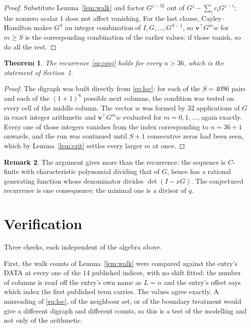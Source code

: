 \documentclass[11pt,a4paper]{article}
\theoremstyle{plain}
\newtheorem{theorem}{Theorem}
\theoremstyle{definition}
\newtheorem{remark}[theorem]{Remark}
\begin{document}
\begin{proof}
Substitute Lemma~\ref{lem:walk} and factor $G^{j-32}$ out of
$G^{j}-\sum_ic_iG^{j-i}$; the nonzero scalar $1$ does not affect
vanishing. For the last clause, Cayley--Hamilton makes $G^{S}$ an integer combination of
$I,G,\dots,G^{S-1}$, so $\mathbf{v}^{\!\top}G^{m}w$ for $m\ge S$ is the corresponding
combination of the earlier values; if those vanish, so do all the rest.
\end{proof}

\begin{theorem}
The recurrence \eqref{eq:conj} holds for every $n>36$, which is the statement of
Section~1.
\end{theorem}

\begin{proof}
The digraph was built directly from \eqref{eq:loc}: for each of the $S=4096$ pairs and each
of the $(1+1)^{6}$ possible next columns, the condition was tested on every cell of
the middle column. The vector $w$ was formed by $32$ applications of $G$ in exact integer
arithmetic and $\mathbf{v}^{\!\top}G^{m}w$ evaluated for $m=0,1,\dots$, again exactly.
Every one of those integers vanishes from the index corresponding to $n=36+1$ onwards,
and the run was continued until $S+1$ consecutive zeros had been seen, which by
Lemma~\ref{lem:crit} settles every larger $m$ at once.
\end{proof}

\begin{remark}
The argument gives more than the recurrence: the sequence is $C$-finite with characteristic
polynomial dividing that of $G$, hence has a rational generating function whose denominator
divides $\det(I-xG)$. The conjectured recurrence is one consequence; the minimal one is a
divisor of $q$.
\end{remark}

\section{Verification}

Three checks, each independent of the algebra above.

First, the walk counts of Lemma~\ref{lem:walk} were compared against the entry's DATA at
every one of the $14$ published indices, with no shift fitted: the number of columns is
read off the entry's own name as $L=n$ and the entry's offset says which index the first
published term carries. The values agree exactly. A misreading of \eqref{eq:loc}, of the
neighbour set, or of the boundary treatment would give a different digraph and different
counts, so this is a test of the modelling and not only of the arithmetic.
\end{document}
